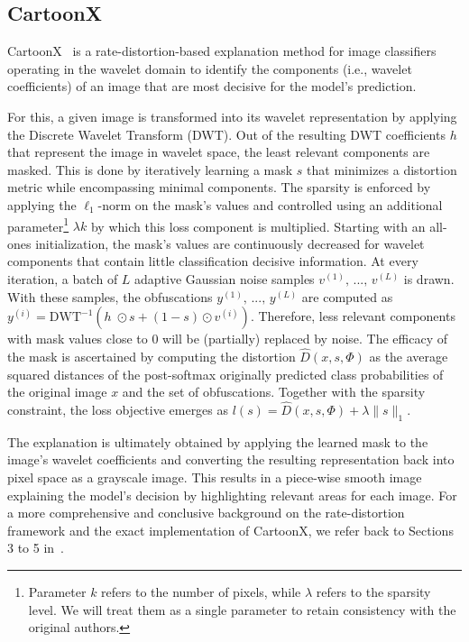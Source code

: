 \subsection{CartoonX} \label{sec:cartoonx}
CartoonX~\cite{cartoonX} is a rate-distortion-based explanation method for image classifiers operating in the wavelet domain to identify the components (i.e., wavelet coefficients) of an image that are most decisive for the model's prediction. 

For this, a given image is transformed into its wavelet representation by applying the Discrete Wavelet Transform (DWT).
Out of the resulting DWT coefficients $h$ that represent the image in wavelet space, the least relevant components are masked. This is done by iteratively learning a mask $s$ that minimizes a distortion metric while encompassing minimal components. The sparsity is enforced by applying the $\ell_1$-norm on the mask's values and controlled using an additional parameter\footnote{Parameter $k$ refers to the number of pixels, while $\lambda$ refers to the sparsity level. We will treat them as a single parameter to retain consistency with the original authors.} $\lambda k$ by which this loss component is multiplied. Starting with an all-ones initialization, the mask's values are continuously decreased for wavelet components that contain little classification decisive information. %
At every iteration, a batch of $L$ adaptive Gaussian noise samples \sloppy${v^{(1)},\,...,\,v^{(L)}}$ is drawn.
With these samples, the obfuscations \sloppy${y^{(1)},\,...,\,y^{(L)}}$ are computed as \sloppy${y^{(i)} = \text{DWT}^{-1}(h\;\odot s + (1-s) \odot v^{(i)})}$.
Therefore, less relevant components with mask values close to $0$ will be (partially) replaced by noise. The efficacy of the mask is ascertained by computing the distortion $\hat{D}(x, s, \Phi)$ as the average squared distances of the post-softmax originally predicted class probabilities of the original image $x$ and the set of obfuscations.
Together with the sparsity constraint, the loss objective emerges as \sloppy${l(s) = \hat{D}(x, s, \Phi) + \lambda \|s\|_1}$.

The explanation is ultimately obtained by applying the learned mask to the image's wavelet coefficients and converting the resulting representation back into pixel space as a grayscale image. This results in a piece-wise smooth image explaining the model's decision by highlighting relevant areas for each image. For a more comprehensive and conclusive background on the rate-distortion framework and the exact implementation of CartoonX, we refer back to Sections 3 to 5 in~\cite{cartoonX}. 

